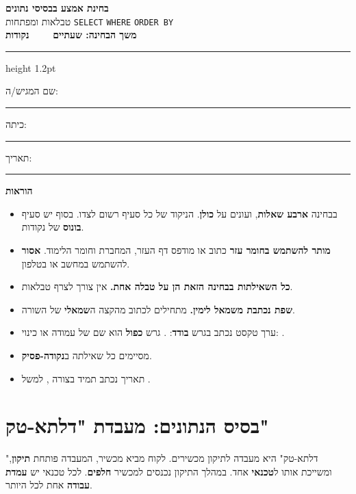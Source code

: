 \documentclass[11pt,a4paper]{article}
\begin{document}
\begin{center}
{\LARGE\bfseries\color{inkblue} בחינת אמצע בבסיסי נתונים}\\[3pt]
{\large טבלאות ומפתחות \textbullet{} \texttt{SELECT} \textbullet{} \texttt{WHERE} \textbullet{} \texttt{ORDER BY}}\\[6pt]
{\large\bfseries משך הבחינה: שעתיים \ \textbar\ \  נקודות}
\end{center}
\vspace{2pt}
{\color{inkblue}\hrule height 1.2pt}
\vspace{8pt}

\noindent שם המגיש/ה:~\rule{5.2cm}{0.4pt}\hfill כיתה:~\rule{2.2cm}{0.4pt}\hfill תאריך:~\rule{3cm}{0.4pt}
\vspace{8pt}

\begin{panel}
\textbf{הוראות}
\begin{itemize}[leftmargin=1.3em, itemsep=2pt, topsep=3pt]
  \item בבחינה \textbf{ארבע שאלות}, ועונים על \textbf{כולן}. הניקוד של כל סעיף רשום לצדו. בסוף יש סעיף \textbf{בונוס} של  נקודות.
  \item \textbf{מותר להשתמש בחומר עזר} כתוב או מודפס \textendash{} דף העזר, המחברת וחומר הלימוד. \textbf{אסור} להשתמש במחשב או בטלפון.
  \item \textbf{כל השאילתות בבחינה הזאת הן על טבלה אחת.} אין צורך לצרף טבלאות.
  \item \textbf{שפת  נכתבת משמאל לימין.} מתחילים לכתוב מהקצה ה\textbf{שמאלי} של השורה.
  \item ערך טקסט נכתב בגרש \textbf{בודד}: . גרש \textbf{כפול} הוא שם של עמודה או כינוי: .
  \item מסיימים כל שאילתה ב\textbf{נקודה-פסיק}.
  \item תאריך נכתב תמיד בצורה , למשל .
\end{itemize}
\end{panel}

\vspace{6pt}
\section*{בסיס הנתונים: מעבדת "דלתא-טק"}
\vspace{6pt}

"דלתא-טק" היא מעבדה לתיקון מכשירים. לקוח מביא מכשיר, המעבדה פותחת \textbf{תיקון}, ומשייכת אותו ל\textbf{טכנאי} אחד. במהלך התיקון נכנסים למכשיר \textbf{חלפים}. לכל טכנאי יש \textbf{עמדת עבודה} אחת לכל היותר.
\end{document}
